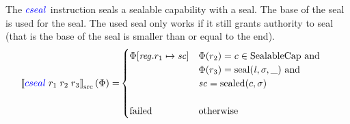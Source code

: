 \documentclass[a4paper]{article}
\newcommand{\sem}[1]{\left\llbracket #1 \right\rrbracket}
\newcommand{\ssem}[2][\Phi]{\sem{#2}_{\mathrm{src}}(#1)}
\newcommand{\sourcecolor}[1]{\color{blue}}
\newcommand{\src}[1]{{\sourcecolor{} #1}}
\newcommand{\zinstr}[1]{#1}
\newcommand{\threeinstr}[4]{
  \ifthenelse{\equal{#2#3#4}{}}
  {\zinstr{#1}}
  {\zinstr{#1} \; #2 \; #3 \; #4}
}
\newcommand{\scseal}[3]{\threeinstr{\src{cseal}}{#1}{#2}{#3}}
\newcommand{\update}[2]{[#1 \mapsto #2]}
\newcommand{\updReg}[2]{\update{\reg.#1}{#2}}
\newcommand{\shareddom}[1]{\mathrm{#1}}
\newcommand{\SealableCaps}{\shareddom{SealableCap}}
\newcommand{\lin}{\var{l}}
\newcommand{\seal}[1]{\shareddom{seal}(#1)}
\newcommand{\sealed}[1]{\shareddom{sealed}(#1)}
\newcommand{\failed}{\mathrm{failed}}
\newcommand{\var}[1]{\mathit{#1}}
\newcommand{\reg}{\var{reg}}
\newcommand{\vsc}{\var{sc}}
\begin{document}
The $\scseal{}{}{}$ instruction seals a sealable capability with a seal. The base of the seal is used for the seal. The used seal only works if it still grants authority to seal (that is the base of the seal is smaller than or equal to the end).
\begin{align*}
  \ssem{\scseal{r_1}{r_2}{r_3}} = & 
                                    \begin{cases}
                                      \Phi\updReg{r_1}{\vsc} & 
                                      \arraycolsep=0pt
                                      \begin{array}[t]{l}
                                        \Phi(r_2) = c \in \SealableCaps \text{ and } \\
                                        \Phi(r_3) = \seal{\lin,\sigma,\_} \text{ and } \\
                                        \vsc = \sealed{c,\sigma}
                                      \end{array}\\
                                      & \\
                                      \failed & \text{otherwise}
                                    \end{cases}
\end{align*}
\end{document}
